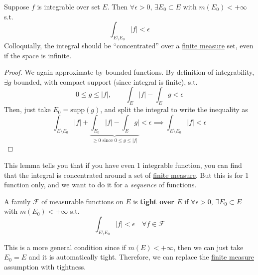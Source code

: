   \begin{lemma}
    \label{thm:absolute-continuity-of-the-integral}
    Suppose $f$ is integrable over set $E$. Then $\forall \epsilon > 0$, $\exists E_0 \subset E$ with $m(E_0) < +\infty$ s.t. 
    \begin{equation}
      \int_{E \setminus E_0} |f| < \epsilon
    \end{equation}
    Colloquially, the integral should be ``concentrated'' over a \hyperref[def:finite-measure]{finite measure} set, even if the space is infinite. 
  \end{lemma}
  \begin{proof}
    We again approximate by bounded functions. By definition of integrability, $\exists g$ bounded, with compact support (since integral is finite), s.t. 
    \begin{equation}
      0 \leq g \leq |f|, \qquad \int_E |f| - \int_E g < \epsilon
    \end{equation}
    Then, just take $E_0 = \mathrm{supp}(g)$, and split the integral to write the inequality as 
    \begin{equation}
      \int_{E \setminus E_0} |f| + \underbrace{\int_{E_0} |f|  - \int_E g|}_{\geq 0 \text{ since } 0 \leq g \leq |f|} < \epsilon \implies  \int_{E \setminus E_0} |f| < \epsilon
    \end{equation}
  \end{proof}

  This lemma tells you that if you have even 1 integrable function, you can find that the integral is concentrated around a set of \hyperref[def:finite-measure]{finite measure}. But this is for 1 function only, and we want to do it for a \textit{sequence} of functions. 

  \begin{definition}[Tight]
    \label{def:tight}
    A family $\mathscr{F}$ of \hyperref[def:measurable-function]{measurable functions} on $E$ is \textbf{tight over $E$} if $\forall \epsilon > 0$, $\exists E_0 \subset E$ with $m(E_0) < +\infty$ s.t. 
    \begin{equation}
      \int_{E \setminus E_0} |f| < \epsilon \quad \forall f \in \mathscr{F}
    \end{equation}
  \end{definition}

  This is a more general condition since if $m(E) < +\infty$, then we can just take $E_0 = E$ and it is automatically tight. Therefore, we can replace the \hyperref[def:finite-measure]{finite measure} assumption with tightness. 


